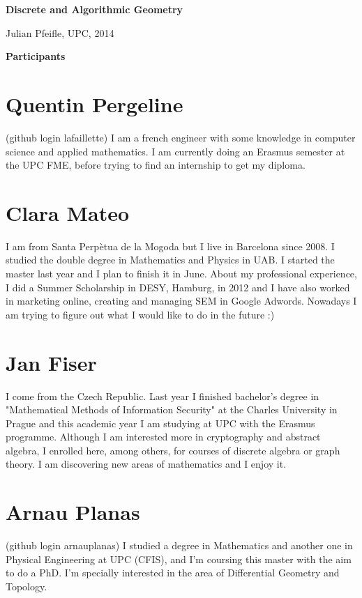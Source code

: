 \documentclass[11pt]{amsart}
\begin{document}
\begin{center}
\textbf{\sffamily
   Discrete and Algorithmic Geometry }

\medskip
   Julian Pfeifle,
   UPC, 2014 \mbox{}
\end{center}

\bigskip

\begin{center}
  \textbf{\sffamily Participants}
\end{center}

\medskip

\section*{Quentin Pergeline}
(github login lafaillette) I am a french engineer with some knowledge in computer science and applied mathematics.
I am currently doing an Erasmus semester at the UPC FME, before trying to find an internship to get my diploma.

\section*{Clara Mateo}
I am from Santa Perp\`etua de la Mogoda but I live in Barcelona since 2008. I studied the double degree in Mathematics and Physics in UAB. I started the master last year and I plan to finish it in June. About my professional experience, I did a Summer Scholarship in DESY, Hamburg, in 2012 and I have also worked in marketing online, creating and managing SEM in Google Adwords. Nowadays I am trying to figure out what I would like to do in the future :)
\medskip


\section*{Jan Fiser}
I come from the Czech Republic. Last year I finished bachelor's degree in "Mathematical Methods of Information Security" at the Charles University in Prague and this academic year I am studying at UPC with the Erasmus programme.
Although I am interested more in cryptography and abstract algebra, I enrolled here, among others, for courses of discrete algebra or graph theory. I am discovering new areas of mathematics and I enjoy it.
\medskip

\section*{Arnau Planas}
(github login arnauplanas) I studied a degree in Mathematics and another one in Physical Engineering at UPC (CFIS), 
and I'm coursing this master with the aim to do a PhD. 
I'm specially interested in the area of Differential Geometry and Topology.
\medskip
\end{document}
